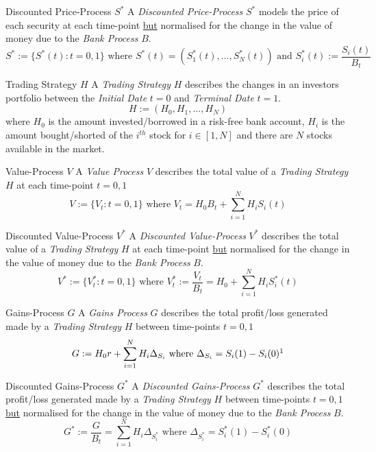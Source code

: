 \documentclass[11pt,a4paper]{article}
\begin{document}
  \begin{definition}{Discounted Price-Process $S^*$}\label{def_discounted_price_process}
    A \textit{Discounted Price-Process} $S^*$ models the price of each security at each time-point \underline{but} normalised for the change in the value of money due to the \textit{Bank Process} $B$.
    \[ S^*:=\{S^*(t):t=0,1\}\text{ where }S^*(t)=(S_1^*(t),\dots,S_N^*(t))\text{ and }S_i^*(t):=\frac{S_i(t)}{B_t} \]
  \end{definition}

  \begin{definition}{Trading Strategy $H$}
    A \textit{Trading Strategy} $H$ describes the changes in an investors portfolio between the \textit{Initial Date} $t=0$ and \textit{Terminal Date} $t=1$.
    \[ H:=(H_0,H_1,\dots,H_N) \]
    where $H_0$ is the amount invested/borrowed in a risk-free bank account, $H_i$ is the amount bought/shorted of the $i^{th}$ stock for $i\in[1,N]$ and there are $N$ stocks available in the market.
  \end{definition}

  \begin{definition}{Value-Process $V$}\label{def_value_process}
    A \textit{Value Process} $V$ describes the total value of a \textit{Trading Strategy} $H$ at each time-point $t=0,1$
    \[ V:=\{V_t:t=0,1\}\text{ where }V_t=H_0B_t+\sum_{i=1}^NH_iS_i(t) \]
  \end{definition}

  \begin{definition}{Discounted Value-Process $V^*$}\label{def_discounted_value_process}
    A \textit{Discounted Value-Process} $V^*$ describes the total value of a \textit{Trading Strategy} $H$ at each time-point \underline{but} normalised for the change in the value of money due to the \textit{Bank Process} $B$.
    \[ V^*:=\{V_t^*:t=0,1\}\text{ where }V_t^*:=\frac{V_t}{B_t}=H_0+\sum_{i=1}^NH_iS_i^*(t) \]
  \end{definition}

  \begin{definition}{Gains-Process $G$}\label{def_gains_process}
    A \textit{Gains Process} $G$ describes the total profit/loss generated made by a \textit{Trading Strategy} $H$ between time-points $t=0,1$
    \[ G:=H_0r+\sum_{i=1}^NH_i\Delta_{S_i}\text{ where }\Delta_{S_i}=S_i(1)-S_i(0)\footnotemark \]
  \end{definition}

  \begin{definition}{Discounted Gains-Process $G^*$}\label{def_discounted_gains_process}
    A \textit{Discounted Gains-Process} $G^*$ describes the total profit/loss generated made by a \textit{Trading Strategy} $H$ between time-points $t=0,1$ \underline{but} normalised for the change in the value of money due to the \textit{Bank Process} $B$.
    \[ G^*:=\frac{G}{B_t}=\sum_{i=1}^NH_i\Delta_{S_i^*}\text{ where }\Delta_{S_i^*}=S_i^*(1)-S_i^*(0) \]
  \end{definition}
\end{document}
